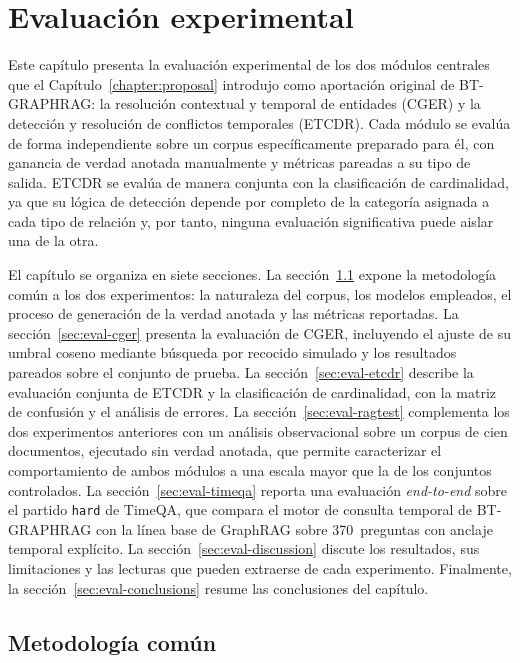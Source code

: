\chapter{Evaluación experimental}\label{chapter:evaluation}

Este capítulo presenta la evaluación experimental de los dos módulos centrales que el Capítulo~\ref{chapter:proposal} introdujo como aportación original de BT-GRAPHRAG: la resolución contextual y temporal de entidades (CGER) y la detección y resolución de conflictos temporales (ETCDR). Cada módulo se evalúa de forma independiente sobre un corpus específicamente preparado para él, con ganancia de verdad anotada manualmente y métricas pareadas a su tipo de salida. ETCDR se evalúa de manera conjunta con la clasificación de cardinalidad, ya que su lógica de detección depende por completo de la categoría asignada a cada tipo de relación y, por tanto, ninguna evaluación significativa puede aislar una de la otra.

El capítulo se organiza en siete secciones. La sección~\ref{sec:eval-setup} expone la metodología común a los dos experimentos: la naturaleza del corpus, los modelos empleados, el proceso de generación de la verdad anotada y las métricas reportadas. La sección~\ref{sec:eval-cger} presenta la evaluación de CGER, incluyendo el ajuste de su umbral coseno mediante búsqueda por recocido simulado y los resultados pareados sobre el conjunto de prueba. La sección~\ref{sec:eval-etcdr} describe la evaluación conjunta de ETCDR y la clasificación de cardinalidad, con la matriz de confusión y el análisis de errores. La sección~\ref{sec:eval-ragtest} complementa los dos experimentos anteriores con un análisis observacional sobre un corpus de cien documentos, ejecutado sin verdad anotada, que permite caracterizar el comportamiento de ambos módulos a una escala mayor que la de los conjuntos controlados. La sección~\ref{sec:eval-timeqa} reporta una evaluación \emph{end-to-end} sobre el partido \texttt{hard} de TimeQA, que compara el motor de consulta temporal de BT-GRAPHRAG con la línea base de GraphRAG sobre 370~preguntas con anclaje temporal explícito. La sección~\ref{sec:eval-discussion} discute los resultados, sus limitaciones y las lecturas que pueden extraerse de cada experimento. Finalmente, la sección~\ref{sec:eval-conclusions} resume las conclusiones del capítulo.

\section{Metodología común}\label{sec:eval-setup}

